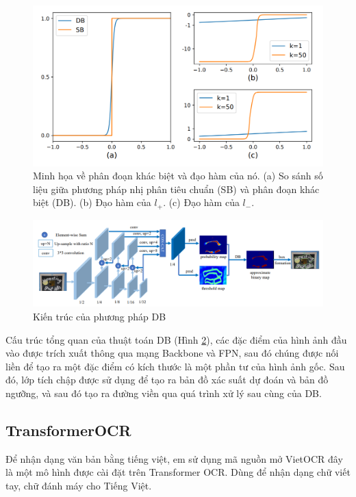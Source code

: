 \begin{figure}[h]
    \includegraphics[scale=0.5]{images/derivative-DB.png}
    \centering
    \caption{Minh họa về phân đoạn khác biệt và đạo hàm của nó. (a) So sánh số liệu giữa phương pháp nhị phân tiêu chuẩn (SB) và phân đoạn khác biệt (DB). (b) Đạo hàm của $l_+$. (c) Đạo hàm của $l_-$. \cite{liao2019realtime}}
    \label{fig11}
\end{figure}

\begin{figure}[h]
    \includegraphics[scale=0.45]{images/architecture-db.png}
    \centering
    \caption{Kiến trúc của phương pháp DB}
    \label{fig12}
\end{figure}

Cấu trúc tổng quan của thuật toán DB (Hình \ref{fig12}), các đặc điểm của hình ảnh đầu vào được trích xuất thông qua mạng Backbone và FPN, sau đó chúng được nối liền để tạo ra một đặc điểm có kích thước là một phần tư của hình ảnh gốc. Sau đó, lớp tích chập được sử dụng để tạo ra bản đồ xác suất dự đoán và bản đồ ngưỡng, và sau đó tạo ra đường viền qua quá trình xử lý sau cùng của DB.

\subsection{TransformerOCR}
Để nhận dạng văn bản bằng tiếng việt, em sử dụng mã nguồn mở VietOCR đây là một mô hình được cài đặt trên Transformer OCR. Dùng để nhận dạng chữ viết tay, chữ đánh máy cho Tiếng Việt.

